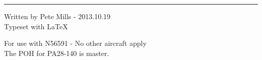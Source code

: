 \documentclass[8pt]{article}
\newenvironment{enumerate*}%
               {\begin{enumerate}%
                   \setlength{\itemsep}{0pt}%
                   \setlength{\parskip}{0pt}}%
               {\end{enumerate}}
\begin{document}
\begin{multicols}{3}
\begin{enumerate*}
	\end{enumerate*}


\rule{0.5\linewidth}{0.25pt}
\scriptsize

Written by Pete Mills - 2013.10.19\\
Typeset with \LaTeX\ 

For use with N56591 - No other aircraft apply\\
The POH for PA28-140 is master.


\end{multicols}
\end{document}
